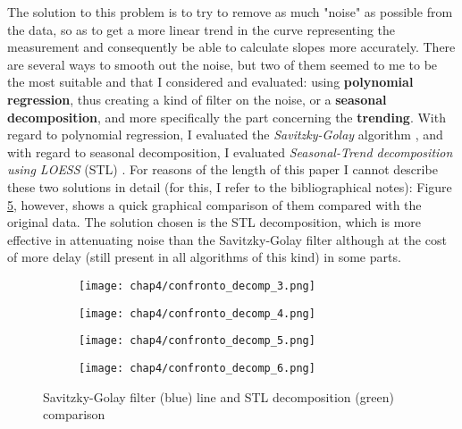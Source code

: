The solution to this problem is to try to remove as much "noise" as possible from the data, so as to get a more linear trend in the curve representing the measurement and consequently be able to calculate slopes more accurately.\newline
There are several ways to smooth out the noise, but two of them seemed to me to be the most suitable and that I considered and evaluated: using \textbf{polynomial regression}, thus creating a kind of filter on the noise, or a \textbf{seasonal decomposition}, and more specifically the part concerning the \textbf{trending}.\newline
With regard to polynomial regression, I evaluated the \textit{Savitzky-Golay} algorithm \cite{savgol}, and with regard to seasonal decomposition, I evaluated \textit{Seasonal-Trend decomposition using LOESS} (STL) \cite{stl_decomp}.\newline
For reasons of the length of this paper I cannot describe these two solutions in detail (for this, I refer to the bibliographical notes): Figure \ref{fig:4_smoothing_comparison}, however, shows a quick graphical comparison of them compared with the original data. The solution chosen is the STL decomposition, which is more effective in attenuating noise than the Savitzky-Golay filter although at the cost of more delay (still present in all algorithms of this kind) in some parts.

\begin{figure}[H]
	\centering
	\begin{subfigure}{0.48\textwidth}
		\texttt{[image: chap4/confronto\_decomp\_3.png]}
		\caption{}
		\label{subfig:4_smoothing1}
	\end{subfigure}
	\hfill
	\begin{subfigure}{0.48\textwidth}
		\texttt{[image: chap4/confronto\_decomp\_4.png]}
		\caption{}
		\label{subfig:4_smoothing2}
	\end{subfigure}
	\begin{subfigure}{0.48\textwidth}
		\texttt{[image: chap4/confronto\_decomp\_5.png]}
		\caption{}
		\label{subfig:4_smoothing3}
	\end{subfigure}
	\begin{subfigure}{0.48\textwidth}
		\texttt{[image: chap4/confronto\_decomp\_6.png]}
		\caption{}
		\label{subfig:4_smoothing4}
	\end{subfigure}
	\caption{Savitzky-Golay filter (blue) line and STL decomposition (green) comparison}
	\label{fig:4_smoothing_comparison}
\end{figure}

